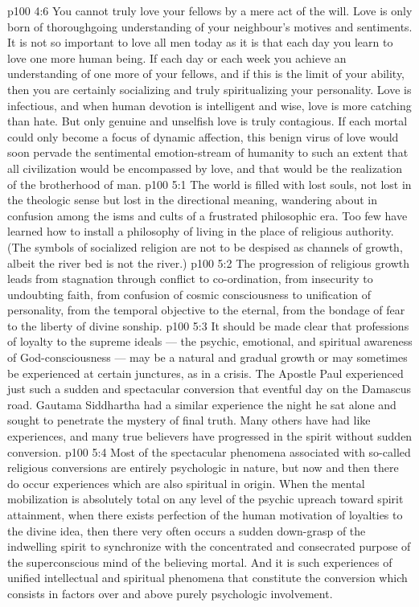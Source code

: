 \vs p100 4:6 You cannot truly love your fellows by a mere act of the will. Love is only born of thoroughgoing understanding of your neighbour’s motives and sentiments. It is not so important to love all men today as it is that each day you learn to love one more human being. If each day or each week you achieve an understanding of one more of your fellows, and if this is the limit of your ability, then you are certainly socializing and truly spiritualizing your personality. Love is infectious, and when human devotion is intelligent and wise, love is more catching than hate. But only genuine and unselfish love is truly contagious. If each mortal could only become a focus of dynamic affection, this benign virus of love would soon pervade the sentimental emotion\hyp{}stream of humanity to such an extent that all civilization would be encompassed by love, and that would be the realization of the brotherhood of man.
\vs p100 5:1 The world is filled with lost souls, not lost in the theologic sense but lost in the directional meaning, wandering about in confusion among the isms and cults of a frustrated philosophic era. Too few have learned how to install a philosophy of living in the place of religious authority. (The symbols of socialized religion are not to be despised as channels of growth, albeit the river bed is not the river.)
\vs p100 5:2 The progression of religious growth leads from stagnation through conflict to co\hyp{}ordination, from insecurity to undoubting faith, from confusion of cosmic consciousness to unification of personality, from the temporal objective to the eternal, from the bondage of fear to the liberty of divine sonship.
\vs p100 5:3 \pc It should be made clear that professions of loyalty to the supreme ideals --- the psychic, emotional, and spiritual awareness of God\hyp{}consciousness --- may be a natural and gradual growth or may sometimes be experienced at certain junctures, as in a crisis. The Apostle Paul experienced just such a sudden and spectacular conversion that eventful day on the Damascus road. Gautama Siddhartha had a similar experience the night he sat alone and sought to penetrate the mystery of final truth. Many others have had like experiences, and many true believers have progressed in the spirit without sudden conversion.
\vs p100 5:4 Most of the spectacular phenomena associated with so\hyp{}called religious conversions are entirely psychologic in nature, but now and then there do occur experiences which are also spiritual in origin. When the mental mobilization is absolutely total on any level of the psychic upreach toward spirit attainment, when there exists perfection of the human motivation of loyalties to the divine idea, then there very often occurs a sudden down\hyp{}grasp of the indwelling spirit to synchronize with the concentrated and consecrated purpose of the superconscious mind of the believing mortal. And it is such experiences of unified intellectual and spiritual phenomena that constitute the conversion which consists in factors over and above purely psychologic involvement.

